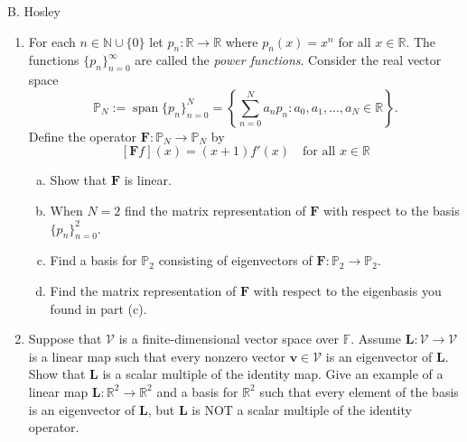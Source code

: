 \documentclass[12pt]{amsart}
\newcommand{\1}{\mathbbm{1}}
\numberwithin{equation}{section}
\numberwithin{Theorem}{section}
\theoremstyle{plain} %
\theoremstyle{definition}
\theoremstyle{remark}
\begin{document}
\thispagestyle{empty}

\hspace{\fill} {\Large B. Hosley}
\bigskip

\begin{enumerate}[1.]

\item For each \(n\in\mathbb{N}\cup\{0\}\) let \(p_{n}:\mathbb{R}\to\mathbb{R}\) where \(p_{n}(x) = x^{n}\) for all \(x\in\mathbb{R}\). The functions \(\{p_{n}\}_{n=0}^{\infty}\) are called the \textit{power functions}. Consider the real vector space 
\[\mathbb{P}_{N}:=\operatorname{span}\{p_{n}\}_{n=0}^{N} = \left\{\sum_{n=0}^{N}a_{n}p_{n} : a_{0},a_{1},\ldots,a_{N}\in\mathbb{R}\right\}.\]
Define the operator \(\mathbf{F}:\mathbb{P}_{N}\to\mathbb{P}_{N}\) by \[[\mathbf{F}f](x) = (x+1)f'(x)\quad\text{for all }x\in\mathbb{R}\]

\medskip

\begin{enumerate}[(a)]

\item Show that \(\mathbf{F}\) is linear.\medskip

\item When \(N=2\) find the matrix representation of \(\mathbf{F}\) with respect to the basis \(\{p_{n}\}_{n=0}^{2}\).\medskip

\item Find a basis for \(\mathbb{P}_{2}\) consisting of eigenvectors of \(\mathbf{F}:\mathbb{P}_{2}\to\mathbb{P}_{2}\).\medskip

\item Find the matrix representation of \(\mathbf{F}\) with respect to the eigenbasis you found in part (c).\medskip

\end{enumerate}\bigskip


\item Suppose that \(\mathcal{V}\) is a finite-dimensional vector space over \(\mathbb{F}\). Assume \(\mathbf{L}:\mathcal{V}\to\mathcal{V}\) is a linear map such that every nonzero vector \(\mathbf{v}\in\mathcal{V}\) is an eigenvector of \(\mathbf{L}\). Show that \(\mathbf{L}\) is a scalar multiple of the identity map. Give an example of a linear map \(\mathbf{L}:\mathbb{R}^{2}\to\mathbb{R}^{2}\) and a basis for \(\mathbb{R}^{2}\) such that every element of the basis is an eigenvector of \(\mathbf{L}\), but \(\mathbf{L}\) is NOT a scalar multiple of the identity operator.


\end{enumerate}
\end{document}
